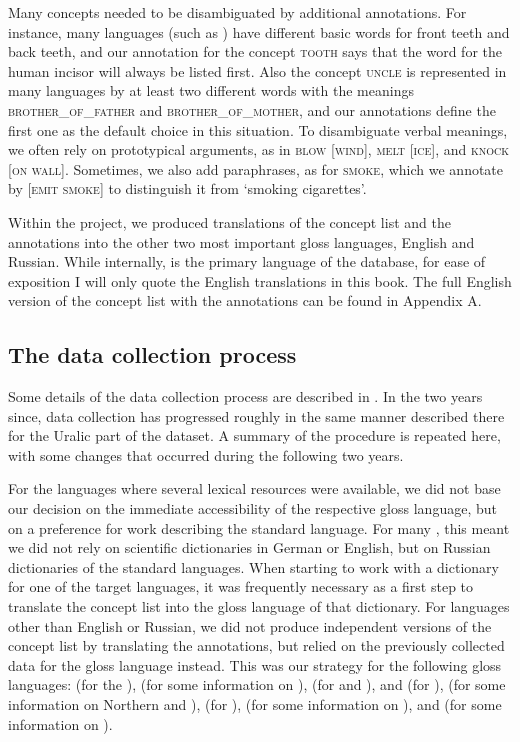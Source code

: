 Many concepts needed to be disambiguated by additional annotations. For instance, many languages (such as ) have different basic words for front teeth and back teeth, and our annotation for the concept \textsc{tooth} says that the word for the human incisor will always be listed first. Also the concept \textsc{uncle} is represented in many languages by at least two different words with the meanings \textsc{brother\_of\_father} and \textsc{brother\_of\_mother}, and our annotations define the first one as the default choice in this situation. To disambiguate verbal meanings, we often rely on prototypical arguments, as in \textsc{blow [wind]}, \textsc{melt [ice]}, and \textsc{knock [on wall]}. Sometimes, we also add paraphrases, as for \textsc{smoke}, which we annotate by \textsc{[emit smoke]} to distinguish it from `smoking cigarettes'.

Within the project, we produced translations of the concept list and the annotations into the other two most important gloss languages, English and Russian. While internally,  is the primary language of the database, for ease of exposition I will only quote the English translations in this book. The full English version of the concept list with the annotations can be found in Appendix A.

\subsection{The data collection process}
Some details of the data collection process are described in \cite{dellert2015a}. In the two years since, data collection has progressed roughly in the same manner described there for the Uralic part of the dataset. A summary of the procedure is repeated here, with some changes that occurred during the following two years.

For the languages where several lexical resources were available, we did not base our decision on the immediate accessibility of the respective gloss language, but on a preference for work describing the standard language. For many , this meant we did not rely on scientific dictionaries in German or English, but on Russian dictionaries of the standard languages. When starting to work with a dictionary for one of the target languages, it was frequently necessary as a first step to translate the concept list into the gloss language of that dictionary. For languages other than English or Russian, we did not produce independent versions of the concept list by translating the annotations, but relied on the previously collected data for the gloss language instead. This was our strategy for the following gloss languages:  (for the ),  (for some information on ),  (for  and ),  and  (for ),  (for some information on Northern  and ),  (for ),  (for some information on ), and  (for some information on ).


